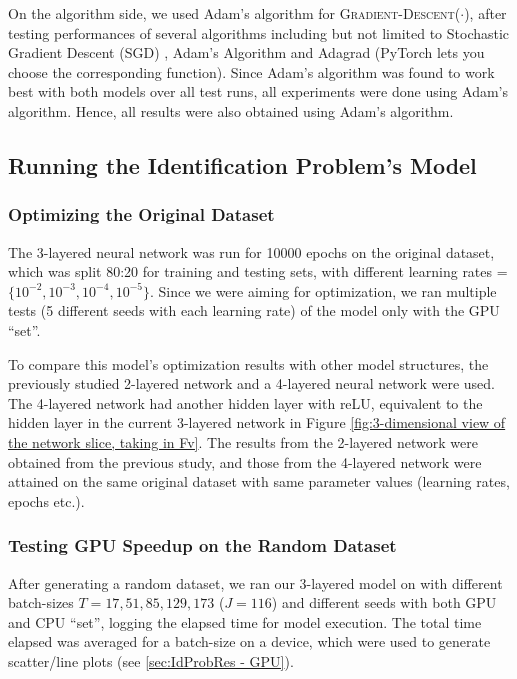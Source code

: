 \documentclass[12pt]{article}
\begin{document}
    On the algorithm side, we used Adam's algorithm for \textsc{Gradient-Descent}($\cdot$), after testing performances of several algorithms including but not limited to Stochastic Gradient Descent (SGD) \cite{SGD}, Adam's Algorithm \cite{Adam} and Adagrad \cite{Adagrad} (PyTorch lets you choose the corresponding function). Since Adam's algorithm was found to work best with both models over all test runs, all experiments were done using Adam's algorithm. Hence, all results were also obtained using Adam's algorithm.
    
    \subsection{Running the Identification Problem's Model} \label{sec:Running the Identification Problem's Model}
    \subsubsection{Optimizing the Original Dataset} \label{sec:Identification Problem-Optimizing the Original Dataset}
    The 3-layered neural network was run for 10000 epochs on the original dataset, which was split 80:20 for training and testing sets, with different learning rates = $\{10^{-2}, 10^{-3}, 10^{-4}, 10^{-5}\}$. Since we were aiming for optimization, we ran multiple tests (5 different seeds with each learning rate) of the model only with the GPU ``set''.
    
    To compare this model's optimization results with other model structures, the previously studied 2-layered network \cite{Xue2016Avi2} and a 4-layered neural network were used. The 4-layered network had another hidden layer with reLU, equivalent to the hidden layer in the current 3-layered network in Figure \ref{fig:3-dimensional view of the network slice, taking in Fv}. The results from the 2-layered network were obtained from the previous study, and those from the 4-layered network were attained on the same original dataset with same parameter values (learning rates, epochs etc.).
    
    \subsubsection{Testing GPU Speedup on the Random Dataset} \label{sec:Identification Problem-Testing GPU Speedup on the Random Dataset}
    After generating a random dataset, we ran our 3-layered model on with different batch-sizes $T = 17, 51, 85, 129, 173$ ($J = 116$) and different seeds with both GPU and CPU ``set'', logging the elapsed time for model execution. The total time elapsed was averaged for a batch-size on a device, which were used to generate scatter/line plots (see \cref{sec:IdProbRes - GPU}).
    
\end{document}
